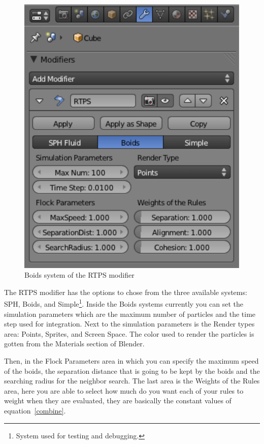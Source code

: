 \begin{figure}[htbp]
\begin{center}
\includegraphics[scale=0.8]{figures/modifier.pdf}
\caption{Boids system of the RTPS modifier}
\label{ui}
\end{center}
\end{figure}

The RTPS modifier has the options to chose from the three available systems: SPH, Boids, and Simple\footnote{System used for testing and debugging.}. Inside the Boids systems currently you can set the simulation parameters which are the maximum number of particles and the time step used for integration.  Next to the simulation parameters is the Render types area: Points, Sprites, and Screen Space. The color used to render the particles is gotten from the Materials section of Blender.

Then, in the Flock Parameters area in which you can specify the maximum speed of the boids, the separation distance that is going to be kept by the boids and the searching radius for the neighbor search. The last area is the Weights of the Rules area, here you are able to select how much do you want each of your rules to weight when they are evaluated, they are basically the constant values of equation~\ref{combine}.

